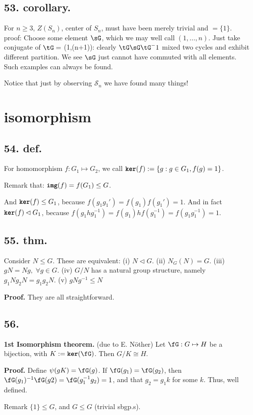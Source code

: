 \documentclass[12pt]{article}
\newcommand\Ev\forall%
\newcommand\Mp\mapsto%
\newcommand{\SF}[1]{ \mathscr{#1} }%
\newcommand{\Ss}[1]{\textsf{\textbf{#1}}}%
\newcommand{\Tw}[1]{\texttt{\textbf{#1}}}%
\begin{document}
\subsection*{53. corollary.} For \(n \geq 3\), \(Z(S_n)\), center of \(S_n\), must have been merely trivial and \(=\{1\}\). 
proof: Choose some element \(\sG\), which we may well call \((1,\dotsc,n)\). 
Just take conjugate of \(\tG=\) (1,(n+1)): clearly \(\tG \sG \tG^-1\) mixed two cycles and exhibit different partition. 
We see \(\sG\) just cannot have commuted with all elements. 
Such examples can always be found. \par
Notice that just by observing \(\SF S_n\) we have found many things!

\section{isomorphism}
\subsection*{54. def.} For homomorphism \( f: G_1  \Mp G_2 \), 
we call \(\Tw{ker}(f) := \{ g: g \in G_1 , f(g) =1 \}\). \par
Remark that: \(\Tw{img}(f) = f(G_1) \leq G\). \par
And \(\Tw{ker}(f) \leq G_1\), because \(f(g_1 g_1') = f(g_1)f(g_1') = 1\). 
And in fact \(\Tw{ker}(f) \lhd G_1\), because \(f(g_1 h g_1^{-1}) = f(g_1) h f(g_1^{-1}) = f(g_1 g_1^{-1}) = 1 \).

\subsection*{55. thm.} Consider \(N \leq G\). These are equivalent:
(i) \(N \lhd G\). 
(ii) \(N_G(N) = G\). 
(iii) \(gN = Ng,\; \Ev g \in G\). 
(iv) \(G/N\) has a natural group structure, namely \(g_1 N g_2 N = g_1 g_2 N\).
(v) \(gNg^{-1} \leq N\) \par
\Ss{Proof.} They are all straightforward. 

\subsection*{56.} \Ss{1st Isomorphism theorem.} (due to E. N\"other) Let \(\fG: G \Mp H\) be a bijection, with \(K:= \Tw{ker}(\fG)\). 
Then \(G / K \cong H\). \par
\Ss{Proof.} Define \(\psi(g K) = \fG(g)\). 
If \(\fG(g_1) = \fG(g_2)\), 
then \(\fG(g_1)^{-1} \fG(g2) = \fG(g_1^{-1} g_2) = 1 \), 
and that \(g_2 = g_1 k\) for some \(k\). 
Thus, well defined. \par
Remark \(\{1\} \leq G\), and \(G \leq G\) (trivial sbgp.s).
\end{document}
